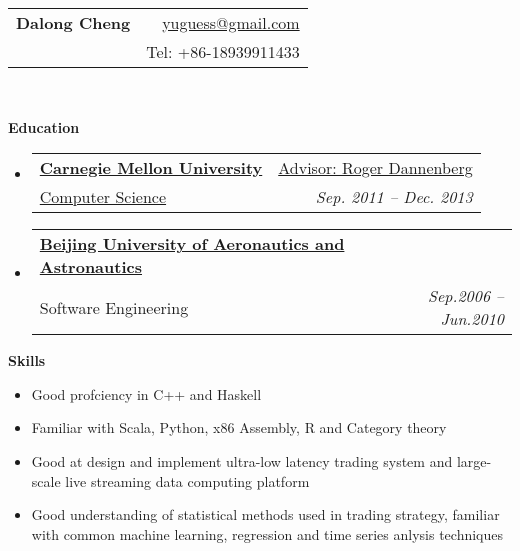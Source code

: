 \documentclass[letterpaper,11pt]{article}
\makeatletter
\newcommand{\resheading}[1]{{\large \colorbox{mygrey}{\begin{minipage}{\textwidth}{\textbf{#1 \vphantom{p\^{E}}}}\end{minipage}}}}
\newcommand{\ressubheading}[4]{
\begin{tabular*}{6.5in}{l@{\extracolsep{\fill}}r}
		\textbf{#1} & #2 \\
		{#3}{} & \textit{#4} \\
\end{tabular*}\vspace{-6pt}}
\makeatother
\begin{document}
\newcommand{\mywebheader}{
\begin{tabular*}{7in}{l@{\extracolsep{\fill}}r}
	\textbf{\LARGE Dalong Cheng} & \href{mailto:yuguess@gmail.com}{yuguess@gmail.com}\\
	{\footnotesize \texttt{}} & {Tel: +86-18939911433} \\
	\end{tabular*}
\\
\vspace{0.1in}}

\mywebheader

\resheading{Education}
  \begin{itemize}
		\item
      \ressubheading{\href{http://www.cmu.edu}
      {Carnegie Mellon University}}
      {\href{http://www.cs.cmu.edu/\~rbd}{Advisor: Roger Dannenberg}} 
      {\href{http://www.cs.cmu.edu/~music/mat/}{Computer Science}{}}
      {Sep. 2011 -- Dec. 2013}

    \item	
      \ressubheading{\href{http://ev.buaa.edu.cn}
      {Beijing University of Aeronautics and Astronautics}}
      {}{Software Engineering}{Sep.2006 -- Jun.2010}

	\end{itemize}

\resheading{{Skills}}
  \begin{itemize}
    \item{\small Good profciency in C++ and Haskell} 
    \item{\small Familiar with Scala, Python, x86 Assembly, R and Category theory}
    \item{\small Good at design and implement ultra-low latency trading system and large-scale live streaming data computing platform}
		\item{\small Good understanding of statistical methods used in trading strategy, familiar with 
      common machine learning, regression and time series anlysis techniques}
	\end{itemize}
\end{document}
